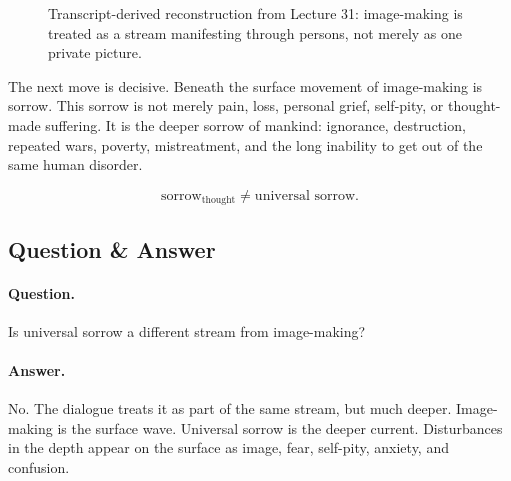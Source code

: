 \documentclass[11pt,oneside]{book}
\begin{document}
\begin{figure}
\centering
{}
\caption{Transcript-derived reconstruction from Lecture 31: image-making is treated as a stream manifesting through persons, not merely as one private picture.}
\end{figure}

The next move is decisive. Beneath the surface movement of image-making is sorrow. This sorrow is not merely pain, loss, personal grief, self-pity, or thought-made suffering. It is the deeper sorrow of mankind: ignorance, destruction, repeated wars, poverty, mistreatment, and the long inability to get out of the same human disorder.

\begin{equation}
\text{sorrow}_{\mathrm{thought}}
\neq
\text{universal sorrow}.
\end{equation}

\subsection{Question \& Answer}

\paragraph{Question.}
Is universal sorrow a different stream from image-making?

\paragraph{Answer.}
No. The dialogue treats it as part of the same stream, but much deeper. Image-making is the surface wave. Universal sorrow is the deeper current. Disturbances in the depth appear on the surface as image, fear, self-pity, anxiety, and confusion.
\end{document}
